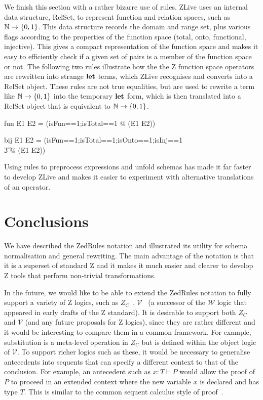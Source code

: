 \documentclass{entcs}
\newcommand{\V}{\mathcal{V}}
\newcommand{\Zc}{Z_C}
\begin{document}
We finish this section with a rather bizarre use of rules.  ZLive uses
an internal data structure, RelSet, to represent function and relation
spaces, such as $\nat \fun \{0,1\}$.  This data structure records the
domain and range set, plus various flags according to the properties
of the function space (total, onto, functional, injective).  This
gives a compact representation of the function space and makes it easy
to efficiently check if a given set of pairs is a member of the
function space or not.  The following two rules illustrate how the the
Z function space operators are rewritten into strange $\mathop{\mathstrut{\mbox{\textbf{let}}}}\nolimits$ terms,
which ZLive recognises and converts into a RelSet object.  These rules
are not true equalities, but are used to rewrite a term like $\nat
\fun \{0,1\}$ into the temporary $\mathop{\mathstrut{\mbox{\textbf{let}}}}\nolimits$ form, which is then translated
into a RelSet object that is equivalent to $\nat \fun \{0,1\}$.

\begin{zedrule}{fun}
   E1 \fun E2 = (\LET isFun==1;isTotal==1 @ \power (E1 \cross E2))
\end{zedrule}
\begin{zedrule}{bij}
   E1 \bij E2 = (\LET isFun==1;isTotal==1;isOnto==1;isInj==1 \\
   \t3               @ \power (E1 \cross E2))
\end{zedrule}

Using rules to preprocess expressions and unfold schemas has made it
far faster to develop ZLive and makes it easier to experiment with
alternative translations of an operator.




\section{Conclusions} \label{sec:concl}

We have described the ZedRules notation and illustrated its utility
for schema normalisation and general rewriting.  The main advantage
of the notation is that it is a superset of standard Z and it makes it
much easier and clearer to develop Z tools that perform non-trivial
transformations.


In the future, we would like to be able to extend the ZedRules
notation to fully support a variety of Z logics, such as
$\Zc$~\cite{henson:revising-z-1-99,henson:revising-z-2-99},
$\V$~\cite{brien:calculus-schemas-z00} (a successor of the
$\mathcal{W}$ logic that appeared in early drafts of the Z standard).
It is desirable to support both $\Zc$ and $\V$ (and any future
proposals for Z logics), since they are rather different and it would
be interesting to compare them in a common framework.  For example,
substitution is a meta-level operation in $\Zc$ but is defined within
the object logic of $\V$.  To support richer logics such as these, it
would be necessary to generalise antecedents into sequents that can
specify a different context to that of the conclusion.  For example,
an antecedent such as $x:T \vdash P$ would allow the proof of $P$ to
proceed in an extended context where the new variable $x$ is declared
and has type $T$.  This is similar to the common sequent calculus
style of proof~\cite{girard:proofs-types90}.
\end{document}
